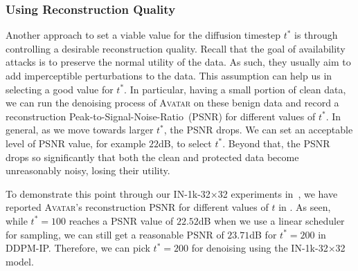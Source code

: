 \documentclass[conference]{IEEEtran}
\theoremstyle{definition}
\theoremstyle{remark}
\theoremstyle{proposition}
\begin{document}
\subsubsection{Using Reconstruction Quality}
Another approach to set a viable value for the diffusion timestep $t^{*}$ is through controlling a desirable reconstruction quality.
Recall that the goal of availability attacks is to preserve the normal utility of the data.
As such, they usually aim to add imperceptible perturbations to the data.
This assumption can help us in selecting a good value for $t^{*}$.
In particular, having a small portion of clean data, we can run the denoising process of \textsc{Avatar} on these benign data and record a reconstruction Peak-to-Signal-Noise-Ratio~(PSNR) for different values of $t^{*}$. 
In general, as we move towards larger $t^{*}$, the PSNR drops. 
We can set an acceptable level of PSNR value, for example $22$dB, to select $t^{*}$. 
Beyond that, the PSNR drops so significantly that both the clean and protected data become unreasonably noisy, losing their utility.

To demonstrate this point through our IN-1k-32$\times$32 experiments in~, we have reported \textsc{Avatar}'s reconstruction PSNR for different values of $t$ in .
As seen, while $t^{*}=100$ reaches a PSNR value of $22.52$dB when we use a linear scheduler for sampling, we can still get a reasonable PSNR of $23.71$dB for $t^{*}=200$ in DDPM-IP.
Therefore, we can pick $t^{*}=200$ for denoising using the IN-1k-32$\times$32 model.
\end{document}
